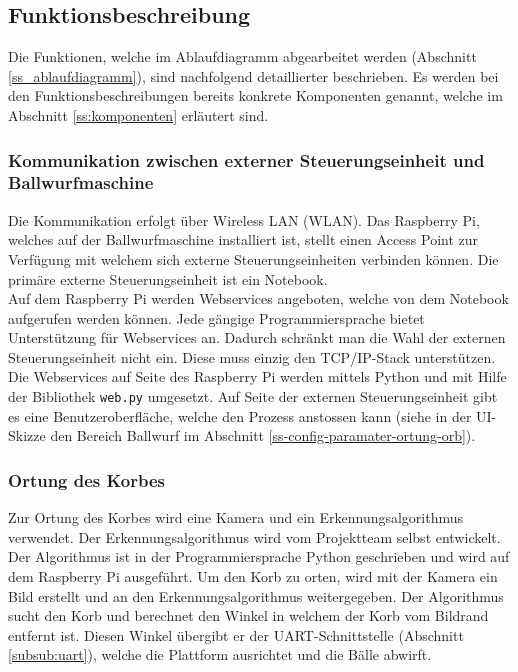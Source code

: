 \subsection{Funktionsbeschreibung}
Die Funktionen, welche im Ablaufdiagramm abgearbeitet werden (Abschnitt \ref{ss_ablaufdiagramm}), sind nachfolgend detaillierter beschrieben. Es werden bei den Funktionsbeschreibungen bereits konkrete Komponenten genannt, welche im Abschnitt \ref{ss:komponenten} erläutert sind.

\subsubsection{Kommunikation zwischen externer Steuerungseinheit und Ballwurfmaschine}
Die Kommunikation erfolgt über Wireless LAN (WLAN). Das Raspberry Pi, welches auf der Ballwurfmaschine installiert ist, stellt einen Access Point zur Verfügung mit welchem sich externe Steuerungseinheiten verbinden können. Die primäre externe Steuerungseinheit ist ein Notebook.\\
Auf dem Raspberry Pi werden Webservices angeboten, welche von dem Notebook aufgerufen werden können. Jede gängige Programmiersprache bietet Unterstützung für Webservices an. Dadurch schränkt man die Wahl der externen Steuerungseinheit nicht ein. Diese muss einzig den TCP/IP-Stack unterstützen. Die Webservices auf Seite des Raspberry Pi werden mittels Python und mit Hilfe der Bibliothek \verb|web.py| umgesetzt. Auf Seite der externen Steuerungseinheit gibt es eine Benutzeroberfläche, welche den Prozess anstossen kann (siehe in der UI-Skizze den Bereich Ballwurf im Abschnitt \ref{ss-config-paramater-ortung-orb}).

\subsubsection{Ortung des Korbes}
Zur Ortung des Korbes wird eine Kamera und ein Erkennungsalgorithmus verwendet. Der Erkennungsalgorithmus wird vom Projektteam selbst entwickelt. Der Algorithmus ist in der Programmiersprache Python geschrieben und wird auf dem Raspberry Pi ausgeführt. Um den Korb zu orten, wird mit der Kamera ein Bild erstellt und an den Erkennungsalgorithmus weitergegeben. Der Algorithmus sucht den Korb und berechnet den Winkel in welchem der Korb vom Bildrand entfernt ist. Diesen Winkel übergibt er der UART-Schnittstelle (Abschnitt \ref{subsub:uart}), welche die Plattform ausrichtet und die Bälle abwirft.

